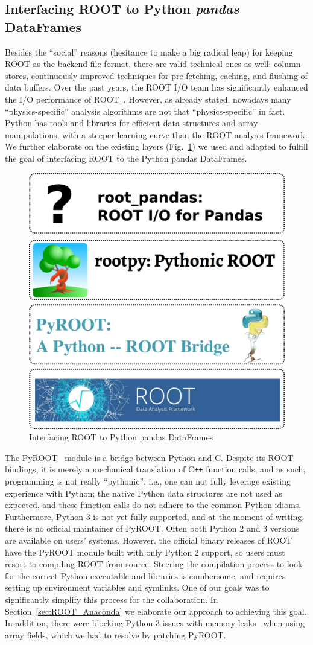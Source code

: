 \documentclass[a4paper]{jpconf}
\begin{document}
\subsection{Interfacing ROOT to Python \textit{pandas} DataFrames}
Besides the ``social'' reasons (hesitance to make a big radical leap) for keeping ROOT as the backend file format, 
there are valid technical ones as well: column stores, continuously improved techniques for pre-fetching, caching, and flushing of data buffers.
Over the past years, the ROOT I/O team has significantly enhanced the I/O performance of ROOT~\cite{1742-6596-331-4-042005}.
However, as already stated, nowadays many ``physics-specific'' analysis algorithms are not that ``physics-specific'' in fact. 
Python has tools and libraries for efficient data structures and array manipulations, with a steeper learning curve than the ROOT analysis framework.
We further elaborate on the existing layers (Fig.~\ref{fig:rootpy_layers}) we used and adapted to fulfill the goal of interfacing ROOT to the Python pandas DataFrames.


\begin{figure}[!t]
\centering
\begin{center}
\includegraphics[width=0.35\linewidth]{./graphics/layers.png}
\caption{Interfacing ROOT to Python pandas DataFrames}
\label{fig:rootpy_layers}
\end{center}
\end{figure}

The PyROOT~\cite{1742-6596-664-6-062029} module is a bridge between Python and C. Despite its ROOT bindings,
it is merely a mechanical translation of C\texttt{++} function calls, and as such, programming is not really ``pythonic'', i.e., one 
can not fully leverage existing experience with Python;
the native Python data structures are not used as expected, and these function calls do not adhere to the common Python idioms. 
Furthermore, Python 3 is not yet fully supported, and at the moment of writing, there is no official maintainer of PyROOT.
Often both Python 2 and 3 versions are available on users' systems. However, the official binary releases of ROOT have the PyROOT module built with only Python 2 
support, so users must resort to compiling ROOT from source. Steering the compilation process to look for the correct Python executable and libraries is cumbersome,
and requires setting up environment variables and symlinks. One of our goals was to significantly simplify this process for the collaboration.
In Section~\ref{sec:ROOT_Anaconda} we elaborate our approach to achieving this goal.
In addition, there were blocking Python 3 issues with memory leaks~\cite{JIRA-ROOT-7854} when using array fields, which we had to resolve by patching PyROOT.
\end{document}
